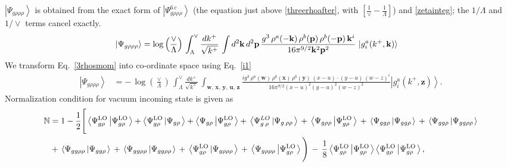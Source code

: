 \documentclass[aps,prd,amsmath,amssymb,nofootinbib]{revtex4-2}
\def\mf#1{\mathbb{#1}}
\numberwithin{equation}{section}
\begin{document}
$\left|\Psi_{g\rho\rho\rho}\right\rangle$ is obtained from  the exact form of $\left|\Psi_{g\rho\rho\rho}^{6\,c}\right\rangle$ (the equation just above \eqref{threerhoafter}, with $\left[\frac{1}{\vee}-\frac{1}{\Lambda}\right]$) and \eqref{zetainteg}; the $1/\Lambda$ and $1/\vee$ terms cancel exactly.
\begin{align}\label{3rhosmom}
    \left|\Psi_{g\rho\rho\rho}\right\rangle & = \log{\left(\frac{\vee}{\Lambda}\right)}\,\int_{\Lambda}^{\vee}\frac{dk^{+}}{\sqrt{k^{+}}}\,\int d^{2}\mathbf{k}\, d^{2}\mathbf{p}\,\frac{g^{3}\,\rho^{a}(-\mathbf{k})\,\rho^{b}(\mathbf{p})\,\rho^{b}(-\mathbf{p})\, \mathbf{k}^{i}}{16\pi^{9/2}\mathbf{k}^{2}\mathbf{p}^{2}}\, \ket{g^{a}_{i}(k^{+},\mathbf{k})}
\end{align}
We transform Eq.~\eqref{3rhosmom} into co-ordinate space using Eq.~\eqref{i1}
\begin{align}\label{3rhospos}
 \left|\Psi_{g\rho\rho\rho}\right\rangle & =  -\,\log{\left(\frac{\vee}{\Lambda}\right)}\,\int_{\Lambda}^{\vee}\frac{dk^{+}}{\sqrt{k^{+}}}\,\int_{\mathbf{w},\, \mathbf{x},\, \mathbf{y},\, \mathbf{u},\, \mathbf{z}}\frac{ig^{3}\,\rho^{a}(\mathbf{w})\,\rho^{b}(\mathbf{x})\,\rho^{b}(\mathbf{y})\, (x-u)\cdot (y-u)\,(w-z)^{i}}{16\pi^{9/2}(x-u)^{2}(y-u)^{2}(w-z)^{2}}\left|g_{i}^{a}(k^{+},\mathbf{z})\right\rangle .
\end{align}
Normalization condition for vacuum incoming state is given as
\begin{align}
    \mf{N} & = 1-\frac{1}{2}\Bigg[\left\langle \Psi_{g\rho}^{\text{LO}}\left|\Psi_{g\rho}^{\text{LO}}\right.\right\rangle + \left\langle \Psi_{g\rho}^{\text{LO}}\left|\Psi_{g\rho}\right.\right\rangle +\left\langle \Psi_{g\rho}\left|\Psi_{g\rho}^{\text{LO}}\right.\right\rangle +\,\left\langle \Psi_{g\:\rho}^{LO}\left|\Psi_{g\:\rho\rho}\right.\right\rangle \,+\,\left\langle \Psi_{g\rho\rho}\left|\Psi_{g\rho}^{\text{LO}}\right.\right\rangle \,+\,\left\langle \Psi_{gg\rho}\left|\Psi_{gg\rho}\right.\right\rangle \,+\,\left\langle \Psi_{gg\rho}\left|\Psi_{gg\rho\rho}\right.\right\rangle \notag \\ & +\,\left\langle \Psi_{gg\rho\rho}\left|\Psi_{gg\rho}\right.\right\rangle\,+\,\left\langle \Psi_{gg\rho\rho}\left|\Psi_{gg\rho\rho}\right.\right\rangle \,+\,\left\langle \Psi_{g\rho}^{\text{LO}}\left|\Psi_{g\rho\rho\rho}\right.\right\rangle \,+\,\left\langle \Psi_{g\rho\rho\rho}\left|\Psi_{g\rho}^{\text{LO}}\right.\right\rangle \Bigg)\,-\,\frac{1}{8}\left\langle \Psi_{g\rho}^{\text{LO}}\left|\Psi_{g\rho}^{\text{LO}}\right.\right\rangle \left\langle \Psi_{g\rho}^{\text{LO}}\left|\Psi_{g\rho}^{\text{LO}}\right.\right\rangle,
\end{align}
\end{document}
